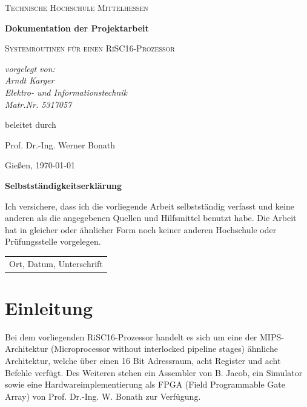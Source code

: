 \documentclass[fleqn, a4paper, 11pt]{article}       %
\begin{document}
\begin{titlepage}
	\centering
	{\scshape\LARGE Technische Hochschule Mittelhessen \par}
	\vspace{1cm}
	{\huge\bfseries Dokumentation der Projektarbeit \par}
	\vspace{1.5cm}
	{\scshape\Large Systemroutinen für einen RiSC16-Prozessor \par}
	\vspace{2cm}
	{\Large\itshape vorgelegt von: \\ Arndt Karger \\ Elektro-  und Informationstechnik\\ Matr.Nr. 5317057\par}
	\vfill
	beleitet durch\par
    Prof. Dr.-Ing. Werner Bonath
	\vfill

	{\large Gießen, \today\par}
\end{titlepage}

\thispagestyle{empty}
{\huge\bfseries Selbstständigkeitserklärung \par}
\vspace{1cm}

\noindent Ich versichere, dass ich die vorliegende Arbeit selbstständig verfasst und keine anderen als die angegebenen
Quellen und Hilfsmittel benutzt habe. Die Arbeit hat in gleicher oder ähnlicher Form noch keiner anderen
Hochschule oder Prüfungsstelle vorgelegen.

\vspace{4cm}
\begin{flushleft}
\begin{tabular}{@{}l@{}}\hline
Ort, Datum, Unterschrift
\end{tabular}
\end{flushleft}

\newpage
\thispagestyle{empty}
\tableofcontents
\newpage
\setcounter{page}{1}

\section{Einleitung}
Bei dem vorliegenden RiSC16-Prozessor handelt es sich um eine der MIPS-Architektur (Microprocessor without interlocked pipeline stages) \cite{MIPS} ähnliche Architektur, welche über einen 16 Bit Adressraum, acht Register und acht Befehle verfügt. Des Weiteren stehen ein Assembler von B. Jacob, ein Simulator sowie eine Hardwareimplementierung als FPGA (Field Programmable Gate Array) von Prof. Dr.-Ing. W. Bonath zur Verfügung. 
\end{document}
